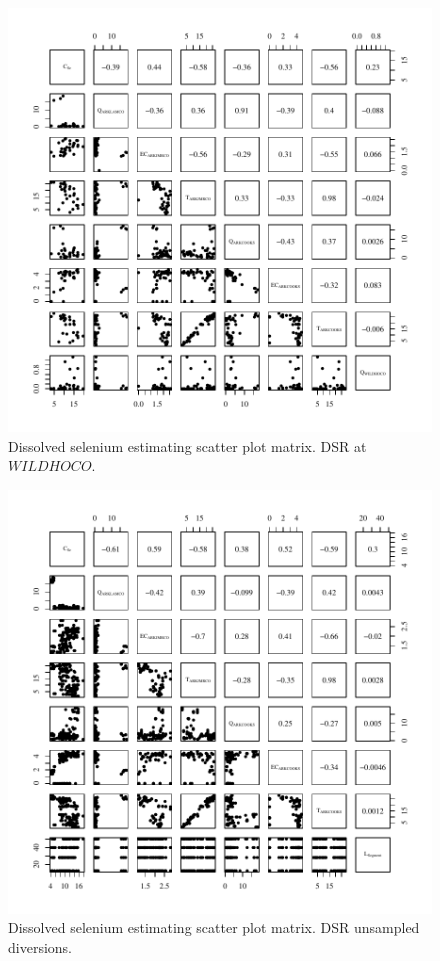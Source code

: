 \begin{figure}[htbp]
	\begin{center}
	\includegraphics[width=6in]{"Figures/Results_DSR/Conc Model Full PairsWIL"}
	\caption{Dissolved selenium estimating scatter plot matrix.  DSR at $WILDHOCO$.}
	\end{center}
\end{figure}

\begin{figure}[htbp]
	\begin{center}
	\includegraphics[width=6in]{"Figures/Results_DSR/Conc Model Full PairsDDIV"}
	\caption{Dissolved selenium estimating scatter plot matrix.  DSR unsampled diversions.}
	\end{center}
\end{figure}
